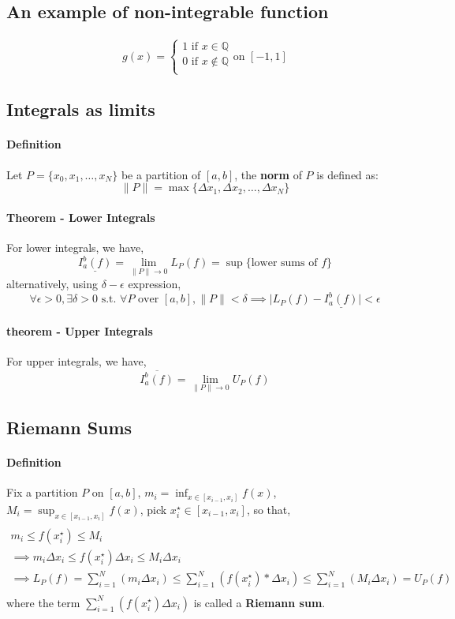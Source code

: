 \documentclass{article}
\begin{document}
	\subsection{An example of non-integrable function}
	\paragraph{}
	\[
	g(x) = \begin{cases}
		1 \text{ if } x \in \mathbb{Q} \\
		0 \text{ if } x \notin \mathbb{Q} \\
	\end{cases} \text{on } [-1, 1]
	\]
	\subsection{Integrals as limits}
	\paragraph{Definition} Let $P = \{x_0, x_1, \dots , x_N\}$ be a partition of $[a,b]$, the \textbf{norm} of $P$ is defined as:
	\[
	\lVert P \rVert = \max\{\Delta x_1, \Delta x_2, \dots, \Delta x_N\}
	\]
	\paragraph{Theorem - Lower Integrals} For lower integrals, we have, 
	\[
	\underline{I_a^b (f)} = \lim_{\lVert P \rVert \to 0} L_P (f) = \sup\{\text{lower sums of } f\}
	\]
	alternatively, using $\delta - \epsilon$ expression,
	\[
	\forall \epsilon > 0, \exists \delta > 0 \text{ s.t. } \forall P \text{ over } [a,b], \lVert P \rVert < \delta \implies \lvert L_P (f) - \underline{I_a^b (f)} \rvert < \epsilon
	\]
	\paragraph{theorem - Upper Integrals} For upper integrals, we have,
	\[
	\overline{I_a^b (f)} = \lim_{\lVert P \rVert \to 0}U_P (f)
	\]
	\subsection{Riemann Sums}
	\paragraph{Definition} Fix a partition $P$ on $[a,b]$, $m_i = \inf_{x \in [x_{i-1}, x_i]} f(x)$, $M_i = \sup_{x \in [x_{i-1}, x_i]} f(x)$, pick $x_i^\star \in [x_{i-1}, x_i]$, so that,
	\begin{multline*}
	\\
	m_i \leq f(x_i^\star) \leq M_i \\
	\implies m_i \Delta x_i \leq f(x_i^\star) \Delta x_i \leq M_i \Delta x_i \\
	\implies L_P (f) = \sum_{i=1}^{N}(m_i \Delta x_i) \leq \sum_{i=1}^{N}(f(x_i^\star) * \Delta x_i) \leq \sum_{i=1}^{N}(M_i \Delta x_i) = U_P (f)
	\\
	\end{multline*}
	where the term $\sum_{i=1}^{N}(f(x_i^\star) \Delta x_i)$ is called a \textbf{Riemann sum}.
\end{document}
